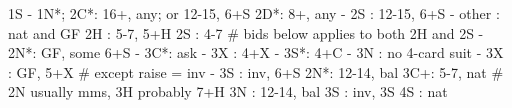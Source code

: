 1S - 1N*; 2C*: 16+, any; or 12-15, 6+S
2D*: 8+, any
   - 2S : 12-15, 6+S
   - other : nat and GF
2H : 5-7, 5+H
2S : 4-7
# bids below applies to both 2H and 2S
   - 2N*: GF, some 6+S
        - 3C*: ask
             - 3X : 4+X
             - 3S*: 4+C
             - 3N : no 4-card suit
   - 3X : GF, 5+X  # except raise = inv
   - 3S : inv, 6+S
2N*: 12-14, bal
3C+: 5-7, nat  # 2N usually mms, 3H probably 7+H
3N : 12-14, bal
3S : inv, 3S
4S : nat